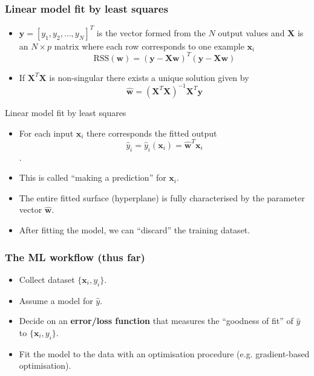 \documentclass[notes]{beamer}          %
\newcommand{\vect}[1]{\bm{#1}}
\newif\iffull
\begin{document}
\begin{frame}
\frametitle{Linear model fit by least squares}
    \begin{itemize}
        \item $\vect{y} = [y_1, y_2, \ldots, y_N]^T$ is the vector formed from the $N$ output values and $\vect{X}$ is an $N \times p$ matrix where each row corresponds to one example $\vect{x}_i$  \\
        $$\mbox{RSS}(\vect{w}) =  (\vect{y} - \vect{X} \vect{w})^T (\vect{y} - \vect{X} \vect{w})$$
    \item    If $\vect{X}^T\vect{X}$ is non-singular there exists a unique solution given by
        $$\hat{\vect{w}} = (\vect{X}^T\vect{X})^{-1}\vect{X}^T \vect{y}$$
    \end{itemize}
\iffull
         {\bf Question}: Why not simply $\vect{y} -\vect{X}\vect{w}=  \vect{0}$ $\rightarrow$ $\vect{y} = \vect{X}\vect{w}$ $\rightarrow$ $\hat{\vect{w}} = \vect{X}^{-1} \vect{y}$?
\fi
\end{frame}


\begin{frame}{Linear model fit by least squares}
    \begin{itemize}
        \item For each input $\vect{x}_i$ there corresponds the fitted output $$\hat{y}_i = \hat{y}_i(\vect{x}_i) = \hat{\vect{w}}^T\vect{x}_i$$.
        \item This is called ``making a prediction'' for $\vect{x}_i$.

        \item The entire fitted surface (hyperplane) is fully characterised by the parameter vector $\hat{\vect{w}}$.

        \item After fitting the model, we can ``discard'' the training dataset. 
    \end{itemize}
\end{frame}

\begin{frame}
\frametitle{The ML workflow (thus far)}
\begin{itemize}
  \item Collect dataset $\{\mathbf{x}_i, y_i\}$.
  \item Assume a model for $\hat{y}$.
  \item Decide on an \textbf{error/loss function} that measures the ``goodness of fit'' of $\hat{y}$ to  $\{\mathbf{x}_i, y_i\}$.
  \item Fit the model to the data with an optimisation procedure (e.g. gradient-based optimisation).
\end{itemize}
\end{frame}
\end{document}
